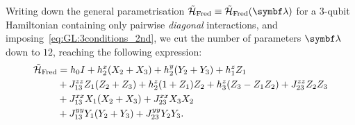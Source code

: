 Writing down the general parametrisation $\HTildeFred\equiv\HTildeFred(\bslambda)$ for a $3$-qubit Hamiltonian containing only pairwise \emph{diagonal} interactions,
and imposing~\cref{eq:GL:3conditions_2nd}, we cut the number of parameters $\bslambda$ down to $12$, reaching the following expression:
\begin{equation}
\begin{aligned}
    \tilde{{\mathcal{H}}}_{\operatorname{Fred}} &=
    h_0 I
    + h_2^x (X_2 + X_3)
    + h_2^y (Y_2 + Y_3)
    + h_1^z Z_1 \\
    &+ J_{13}^{zz} Z_1(Z_2 + Z_3)
    + h_2^z (1 + Z_1) Z_2
    + h_3^z (Z_3 - Z_1 Z_2)
    + J_{23}^{zz} Z_2 Z_3 \\
    &+ J_{13}^{xx} X_1(X_2 + X_3)
    + J_{23}^{xx} X_3 X_2 \\
    &+ J_{13}^{yy} Y_1 (Y_2 + Y_3)
    + J_{23}^{yy} Y_2 Y_3.
\end{aligned}
\end{equation}

